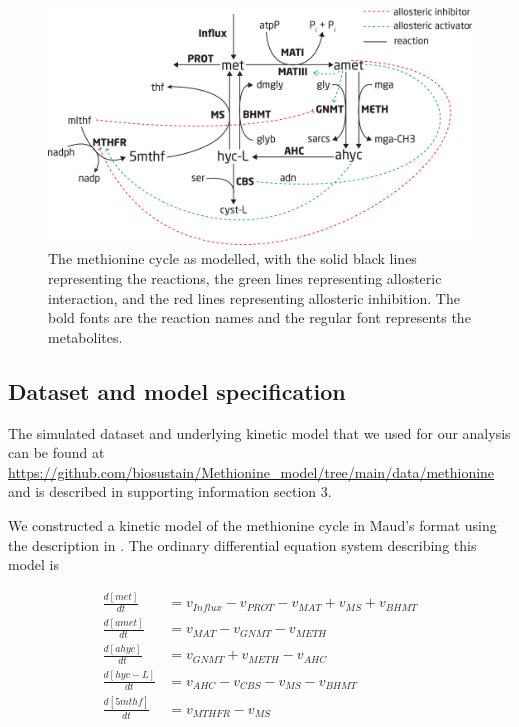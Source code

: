 \documentclass[journal=asbcd6,manuscript=article,layout=traditional]{achemso}
\begin{document}
\begin{figure}

\begin{minipage}{\linewidth}

\includegraphics{./figures/methionine-reactions.png}

\end{minipage}%

\caption{\label{fig-methionine-reactions}The methionine cycle as
modelled, with the solid black lines representing the reactions, the
green lines representing allosteric interaction, and the red lines
representing allosteric inhibition. The bold fonts are the reaction
names and the regular font represents the metabolites.}

\end{figure}%

\subsection{Dataset and model
specification}\label{dataset-and-model-specification}

The simulated dataset and underlying kinetic model that we used for our
analysis can be found at
\url{https://github.com/biosustain/Methionine_model/tree/main/data/methionine}
and is described in supporting information section 3.

We constructed a kinetic model of the methionine cycle in Maud's format
using the description in \citet{korendyaseva_allosteric_2008}. The
ordinary differential equation system describing this model is

\begin{align}
\frac{d[met]}{dt} &= v_{Influx} - v_{PROT} - v_{MAT} +v_{MS} + v_{BHMT} \label{eq-meth-ode} \\
\frac{d[amet]}{dt} &= v_{MAT} - v_{GNMT} - v_{METH} \nonumber \\
\frac{d[ahyc]}{dt} &= v_{GNMT} + v_{METH} - v_{AHC} \nonumber \\
\frac{d[hyc-L]}{dt} &= v_{AHC} - v_{CBS} - v_{MS} - v_{BHMT} \nonumber \\
\frac{d[5mthf]}{dt} &= v_{MTHFR} - v_{MS} \nonumber 
\end{align}
\end{document}

